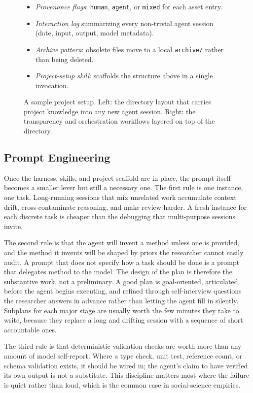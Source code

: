 \documentclass[11pt]{article}
\begin{document}
\begin{figure}[t]
\begin{minipage}[t]{0.50\textwidth}
\begin{itemize}[leftmargin=*, itemsep=3pt, topsep=4pt]
      \item \emph{Provenance flags}: \texttt{human}, \texttt{agent}, or \texttt{mixed} for each asset entry.
      \item \emph{Interaction log} summarizing every non-trivial agent session (date, input, output, model metadata).
      \item \emph{Archive pattern}: obsolete files move to a local \texttt{archive/} rather than being deleted.
      \item \emph{Project-setup skill}: scaffolds the structure above in a single invocation.
    \end{itemize}
  \end{minipage}
  \caption{A sample project setup. Left: the directory layout that carries project knowledge into any new agent session. Right: the transparency and orchestration workflows layered on top of the directory.}
  \label{fig:project-setup}
\end{figure}

\subsection{Prompt Engineering}
\label{sec:deploy-prompt}

Once the harness, skills, and project scaffold are in place, the prompt itself becomes a smaller lever but still a necessary one. The first rule is one instance, one task. Long-running sessions that mix unrelated work accumulate context drift, cross-contaminate reasoning, and make review harder. A fresh instance for each discrete task is cheaper than the debugging that multi-purpose sessions invite.

The second rule is that the agent will invent a method unless one is provided, and the method it invents will be shaped by priors the researcher cannot easily audit. A prompt that does not specify how a task should be done is a prompt that delegates method to the model. The design of the plan is therefore the substantive work, not a preliminary. A good plan is goal-oriented, articulated before the agent begins executing, and refined through self-interview questions the researcher answers in advance rather than letting the agent fill in silently. Subplans for each major stage are usually worth the few minutes they take to write, because they replace a long and drifting session with a sequence of short accountable ones.

The third rule is that deterministic validation checks are worth more than any amount of model self-report. Where a type check, unit test, reference count, or schema validation exists, it should be wired in; the agent's claim to have verified its own output is not a substitute. This discipline matters most where the failure is quiet rather than loud, which is the common case in social-science empirics.
\end{document}
